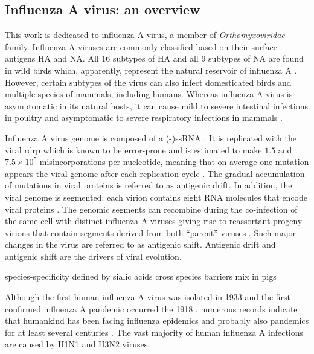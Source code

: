 	\subsection{Influenza A virus: an overview}
	
	This work is dedicated to influenza A virus, a member of  \textit{Orthomyxoviridae} family. Influenza A viruses are commonly classified based on their surface antigens \gls{HA} and \gls{NA}. All 16 subtypes of \gls{HA} and all 9 subtypes of \gls{NA} are found in wild birds which, apparently, represent the natural reservoir of influenza A \parencite{Stallknecht2007}. However, certain subtypes of the virus can also infect domesticated birds and multiple species of mammals, including humans. Whereas influenza A virus is asymptomatic in its natural hosts, it can cause mild to severe intestinal infections in poultry and asymptomatic to severe respiratory infections in mammals \parencite{Webster1992a}. 
	
	Influenza A virus genome is composed of a \gls{(-)ssRNA} \parencite{Palese1977}. It is replicated with the viral \gls{rdrp} which is known to be error-prone and is estimated to make $1.5$ and $7.5\times10^5$ misincorporations per nucleotide, meaning that on average one mutation appears the viral genome after each replication cycle \parencite{Drake1993, Parvin1986}. The gradual accumulation of mutations in viral proteins is referred to as antigenic drift.	In addition, the viral genome is segmented: each virion contains eight RNA molecules that encode viral proteins \parencite{McGeoch1976}. The genomic segments can recombine during the co-infection of the same cell with distinct influenza A viruses giving rise to reassortant progeny virions that contain segments derived from both ``parent'' viruses \parencite{Desselberger1978}. Such major changes in the virus are referred to as antigenic shift. Antigenic drift and antigenic shift are the drivers of viral evolution.
		
	species-specificity defined by sialic acids
	cross species barriers
	mix in pigs
	
	
	Although the first human influenza A virus was isolated in 1933 \parencite{Smith1933} and the first confirmed influenza A pandemic occurred the 1918 \parencite{Taubenberger1997}, numerous records indicate that humankind has been facing influenza epidemics and probably also pandemics for at least several centuries \parencite{Potter2001}. The vast majority of human influenza A infections are caused by H1N1 and H3N2 viruses.
	
